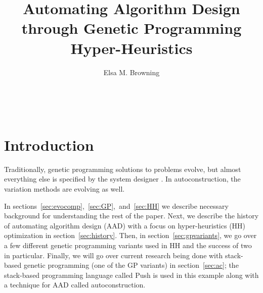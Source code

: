 \documentclass{sig-alternate}
\begin{document}

\title{Automating Algorithm Design through Genetic Programming Hyper-Heuristics}


\author{
\alignauthor
Elsa M. Browning\\
	\\
	\\
	\\
}

\maketitle
\begin{abstract}
	
\end{abstract}


\section{Introduction}
\label{sec:introduction}

Traditionally, genetic programming solutions to problems evolve, but almost everything else is specified by the system designer \cite{spector:2016}. In autoconstruction, the variation methods are evolving as well.

In sections~\ref{sec:evocomp},~\ref{sec:GP},~and~\ref{sec:HH} we describe necessary background for understanding the rest of the paper. Next, we describe the history of automating algorithm design (AAD) with a focus on hyper-heuristics (HH) optimization in section~\ref{sec:history}. Then, in section~\ref{sec:gpvariants}, we go over a few different genetic programming variants used in HH and the success of two in particular. Finally, we will go over current research being done with stack-based genetic programming (one of the GP variants) in section~\ref{sec:ac}; the stack-based programming language called Push is used in this example along with a technique for AAD called autoconstruction.
\end{document}
